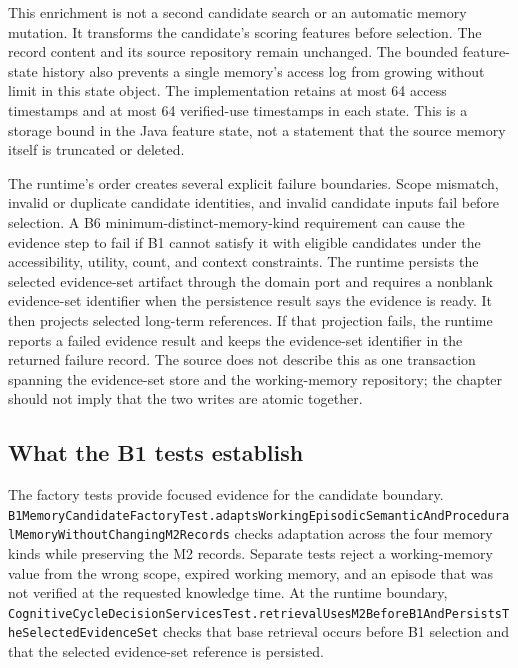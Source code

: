 This enrichment is not a second candidate search or an automatic memory mutation. It transforms the candidate's scoring features before selection. The record content and its source repository remain unchanged. The bounded feature-state history also prevents a single memory's access log from growing without limit in this state object. The implementation retains at most 64 access timestamps and at most 64 verified-use timestamps in each state. This is a storage bound in the Java feature state, not a statement that the source memory itself is truncated or deleted.

The runtime's order creates several explicit failure boundaries. Scope mismatch, invalid or duplicate candidate identities, and invalid candidate inputs fail before selection. A B6 minimum-distinct-memory-kind requirement can cause the evidence step to fail if B1 cannot satisfy it with eligible candidates under the accessibility, utility, count, and context constraints. The runtime persists the selected evidence-set artifact through the domain port and requires a nonblank evidence-set identifier when the persistence result says the evidence is ready. It then projects selected long-term references. If that projection fails, the runtime reports a failed evidence result and keeps the evidence-set identifier in the returned failure record. The source does not describe this as one transaction spanning the evidence-set store and the working-memory repository; the chapter should not imply that the two writes are atomic together.

\subsection{What the B1 tests establish}
\label{subsec:ch21-b1-factory-tests}

The factory tests provide focused evidence for the candidate boundary. \texttt{B1\allowbreak{}Memory\allowbreak{}Candidate\allowbreak{}Factory\allowbreak{}Test.\allowbreak{}adapts\allowbreak{}Working\allowbreak{}Episodic\allowbreak{}Semantic\allowbreak{}And\allowbreak{}Procedural\allowbreak{}Memory\allowbreak{}Without\allowbreak{}Changing\allowbreak{}M2\allowbreak{}Records} checks adaptation across the four memory kinds while preserving the M2 records. Separate tests reject a working-memory value from the wrong scope, expired working memory, and an episode that was not verified at the requested knowledge time. At the runtime boundary, \texttt{Cognitive\allowbreak{}Cycle\allowbreak{}Decision\allowbreak{}Services\allowbreak{}Test.\allowbreak{}retrieval\allowbreak{}Uses\allowbreak{}M2\allowbreak{}Before\allowbreak{}B1\allowbreak{}And\allowbreak{}Persists\allowbreak{}The\allowbreak{}Selected\allowbreak{}Evidence\allowbreak{}Set} checks that base retrieval occurs before B1 selection and that the selected evidence-set reference is persisted.

